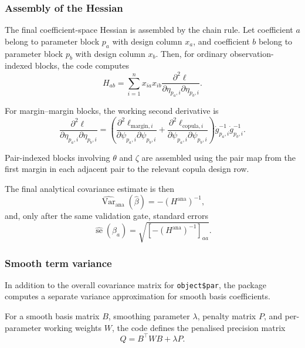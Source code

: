 \documentclass{article}
\begin{document}
\subsubsection{Assembly of the Hessian}

The final coefficient-space Hessian is assembled by the chain rule. Let coefficient $a$ belong to
parameter block $p_a$ with design column $x_a$, and coefficient $b$ belong to parameter block
$p_b$ with design column $x_b$. Then, for ordinary observation-indexed blocks, the code computes
\begin{equation*}
H_{ab} = \sum_{i=1}^n x_{ia} x_{ib}
\frac{\partial^2 \ell}{\partial \eta_{p_a,i} \partial \eta_{p_b,i}}.
\end{equation*}

For margin--margin blocks, the working second derivative is
\begin{equation*}
\frac{\partial^2 \ell}{\partial \eta_{p_a,i} \partial \eta_{p_b,i}}
=
\left(
\frac{\partial^2 \ell_{\text{margin},i}}{\partial \psi_{p_a,i}\partial \psi_{p_b,i}}
+
\frac{\partial^2 \ell_{\text{copula},i}}{\partial \psi_{p_a,i}\partial \psi_{p_b,i}}
\right)
\dot g^{-1}_{p_a,i}\dot g^{-1}_{p_b,i}.
\end{equation*}

Pair-indexed blocks involving $\theta$ and $\zeta$ are assembled using the pair map from the first
margin in each adjacent pair to the relevant copula design row.

The final analytical covariance estimate is then
\begin{equation*}
\widehat{\operatorname{Var}}_{\text{ana}}(\hat{\beta}) = -\left(H^{\text{ana}}\right)^{-1},
\end{equation*}
and, only after the same validation gate, standard errors
\begin{equation*}
\widehat{\operatorname{se}}(\hat{\beta}_a) =
\sqrt{\left[-\left(H^{\text{ana}}\right)^{-1}\right]_{aa}}.
\end{equation*}


\subsubsection{Smooth term variance}
In addition to the overall covariance matrix for \texttt{object\$par}, the package computes a separate
variance approximation for smooth basis coefficients.

For a smooth basis matrix $B$, smoothing parameter $\lambda$, penalty matrix $P$, and per-parameter
working weights $W$, the code defines the penalised precision matrix
\begin{equation*}
Q = B^\top W B + \lambda P.
\end{equation*}
\end{document}
